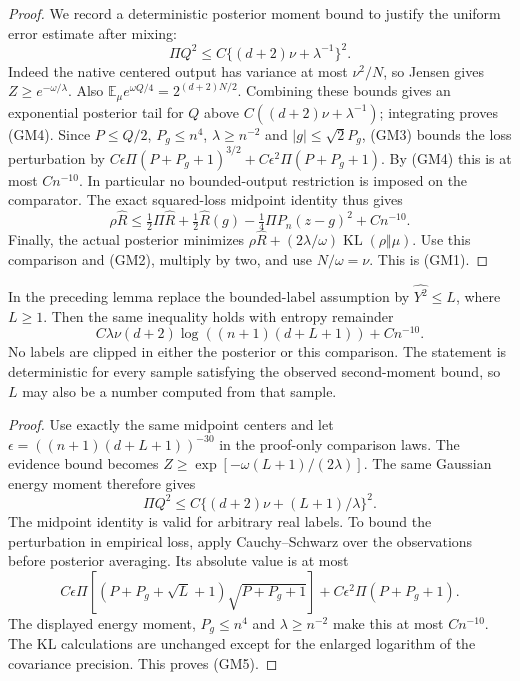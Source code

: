 \begin{proof}
We record a deterministic posterior moment bound to justify the
uniform error estimate after mixing:
\[
 \Pi Q^2\le C\{(d+2)\nu+\lambda^{-1}\}^2. \tag{GM4}
\]
Indeed the native centered output has variance at most $\nu^2/N$,
so Jensen gives $Z\ge e^{-\omega/\lambda}$.
Also $\mathbb E_\mu e^{\omega Q/4}=2^{(d+2)N/2}$.
Combining these bounds gives an exponential posterior tail for $Q$
above $C((d+2)\nu+\lambda^{-1})$; integrating proves (GM4).
Since $P\le Q/2$, $P_g\le n^4$, $\lambda\ge n^{-2}$ and
$|g|\le\sqrt2 P_g$, (GM3) bounds the loss perturbation by
$C\epsilon\Pi(P+P_g+1)^{3/2}+C\epsilon^2\Pi(P+P_g+1)$.
By (GM4) this is at most $Cn^{-10}$. In particular no bounded-output
restriction is imposed on the comparator.
The exact squared-loss midpoint identity thus gives
\[
 \rho\widehat R\le\tfrac12\Pi\widehat R+\tfrac12\widehat R(g)
                  -\tfrac14\Pi P_n(z-g)^2+Cn^{-10}.
\]
Finally, the actual posterior minimizes
$\rho\widehat R+(2\lambda/\omega)\operatorname{KL}(\rho\Vert\mu)$.
Use this comparison and (GM2), multiply by two, and use
$N/\omega=\nu$. This is (GM1).
\end{proof}

\begin{corollary}
\label{cor:general-midpoint-label-moment}
In the preceding lemma replace the bounded-label assumption by
$\widehat{Y^2}\le L$, where $L\ge1$. Then the same inequality holds
with entropy remainder
\[
 C\lambda\nu(d+2)\log((n+1)(d+L+1))+Cn^{-10}. \tag{GM5}
\]
No labels are clipped in either the posterior or this comparison.
The statement is deterministic for every sample satisfying the
observed second-moment bound, so $L$ may also be a number computed
from that sample.
\end{corollary}
\begin{proof}
Use exactly the same midpoint centers and let
$\epsilon=((n+1)(d+L+1))^{-30}$ in the proof-only comparison laws.
The evidence bound becomes
$Z\ge\exp[-\omega(L+1)/(2\lambda)]$.
The same Gaussian energy moment therefore gives
\[
 \Pi Q^2\le C\{(d+2)\nu+(L+1)/\lambda\}^2.
\]
The midpoint identity is valid for arbitrary real labels. To bound
the perturbation in empirical loss, apply Cauchy--Schwarz over the
observations before posterior averaging. Its absolute value is at
most
\[
 C\epsilon\Pi[(P+P_g+\sqrt L+1)\sqrt{P+P_g+1}]
       +C\epsilon^2\Pi(P+P_g+1).
\]
The displayed energy moment, $P_g\le n^4$ and $\lambda\ge n^{-2}$
make this at most $Cn^{-10}$. The KL calculations are unchanged
except for the enlarged logarithm of the covariance precision.
This proves (GM5).
\end{proof}
